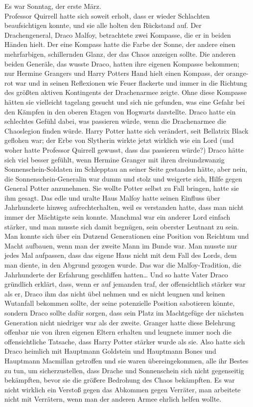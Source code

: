 {Es war Sonntag, der erste März.\\ Professor Quirrell hatte sich soweit erholt, dass er wieder Schlachten beaufsichtigen konnte, und sie alle holten den Rückstand auf. Der Drachengeneral, Draco Malfoy, betrachtete zwei Kompasse, die er in beiden Händen hielt. Der eine Kompass hatte die Farbe der Sonne, der andere einen mehrfarbigen, schillernden Glanz, der das Chaos anzeigen sollte. Die anderen beiden Generäle, das wusste Draco, hatten ihre eigenen Kompasse bekommen; nur Hermine Grangers und Harry Potters Hand hielt einen Kompass, der orange-rot war und in seinen Reflexionen wie Feuer flackerte und immer in die Richtung des größten aktiven Kontingents der Drachenarmee zeigte. Ohne diese Kompasse hätten sie vielleicht tagelang gesucht und sich nie gefunden, was eine Gefahr bei den Kämpfen in den oberen Etagen von Hogwarts darstellte. Draco hatte ein schlechtes Gefühl dabei, was passieren würde, wenn die Drachenarmee die Chaoslegion finden würde. Harry Potter hatte sich verändert, seit Bellatrix Black geflohen war; der Erbe von Slytherin wirkte jetzt wirklich wie ein Lord (und woher hatte Professor Quirrell gewusst, dass das passieren würde?) Draco hätte sich viel besser gefühlt, wenn Hermine Granger mit ihren dreiundzwanzig Sonnenschein-Soldaten im Schlepptau an seiner Seite gestanden hätte, aber nein, die Sonnenschein-Generalin war dumm und stolz und weigerte sich, Hilfe gegen General Potter anzunehmen. Sie wollte Potter selbst zu Fall bringen, hatte sie ihm gesagt. Das edle und uralte Haus Malfoy hatte seinen Einfluss über Jahrhunderte hinweg aufrechterhalten, weil es verstanden hatte, dass man nicht immer der Mächtigste sein konnte. Manchmal war ein anderer Lord einfach stärker, und man musste sich damit begnügen, sein oberster Leutnant zu sein. Man konnte sich über ein Dutzend Generationen eine Position von Reichtum und Macht aufbauen, wenn man der zweite Mann im Bunde war. Man musste nur jedes Mal aufpassen, dass das eigene Haus nicht mit dem Fall des Lords, dem man diente, in den Abgrund gezogen wurde. Das war die Malfoy-Tradition, die Jahrhunderte der Erfahrung geschliffen hatten… Und so hatte Vater Draco gründlich erklärt, dass, wenn er auf jemanden traf, der offensichtlich stärker war als er, Draco ihm das nicht übel nehmen und es nicht leugnen und keinen Wutanfall bekommen sollte, der seine potenzielle Position sabotieren könnte, sondern Draco sollte dafür sorgen, dass sein Platz im Machtgefüge der nächsten Generation nicht niedriger war als der zweite. Granger hatte diese Belehrung offenbar nie von ihren eigenen Eltern erhalten und leugnete immer noch die offensichtliche Tatsache, dass Harry Potter stärker wurde als sie. Also hatte sich Draco heimlich mit Hauptmann Goldstein und Hauptmann Bones und Hauptmann Macmillan getroffen und sie waren übereingekommen, alle ihr Bestes zu tun, um sicherzustellen, dass Drache und Sonnenschein sich nicht gegenseitig bekämpften, bevor sie die größere Bedrohung des Chaos bekämpften. Es war nicht wirklich ein Verstoß gegen das Abkommen gegen Verräter, man arbeitete nicht mit Verrätern, wenn man der anderen Armee ehrlich helfen wollte.

}
